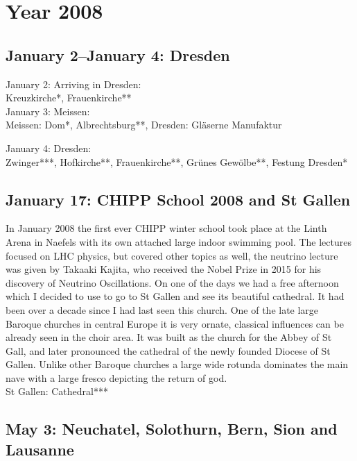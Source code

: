 \chapter{Year 2008}
\label{2008}

\section{January 2--January 4: Dresden}
\label{2008:Dresden}

January 2: Arriving in Dresden:\\

Kreuzkirche*, Frauenkirche**\\

January 3: Meissen:\\

Meissen: Dom*, Albrechtsburg**, Dresden: Gl\"aserne Manufaktur\

January 4: Dresden:\\

Zwinger***, Hofkirche**, Frauenkirche**, Gr\"unes Gew\"olbe**, Festung Dresden*

\section{January 17: CHIPP School 2008 and St Gallen}
\label{2008:StGallen}

In January 2008 the first ever CHIPP winter school took place at the Linth Arena in Naefels with its own attached large indoor swimming pool. The lectures focused on LHC physics, but covered other topics as well, the neutrino lecture was given by Takaaki Kajita, who received the Nobel Prize in 2015 for his discovery of Neutrino Oscillations. On one of the days we had a free afternoon which I decided to use to go to St Gallen and see its beautiful cathedral. It had been over a decade since I had last seen this church. One of the late large Baroque churches in central Europe it is very ornate, classical influences can be already seen in the choir area. It was built as the church for the Abbey of St Gall, and later pronounced the cathedral of the newly founded Diocese of St Gallen. Unlike other Baroque churches a large wide rotunda dominates the main nave with a large fresco depicting the return of god.\\

St Gallen: Cathedral***\\

\section{May 3: Neuchatel, Solothurn, Bern, Sion and Lausanne}
\label{2008:Swisstrip}

